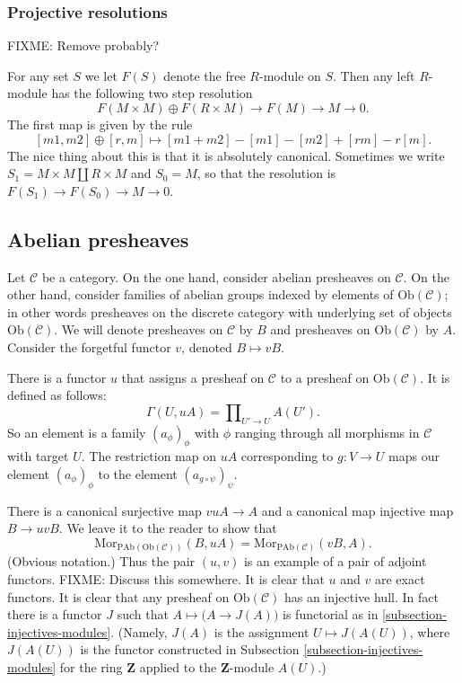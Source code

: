 \subsubsection{Projective resolutions}
\label{subsubsection-projective-resolution}

\noindent
FIXME: Remove probably?

\noindent
For any set $S$ we let $F(S)$ denote the free $R$-module on $S$.
Then any left $R$-module has the following two step resolution
$$
F(M\times M) \oplus F(R\times M) \to F(M) \to M \to 0.
$$
The first map is given by the rule
$$
[m1,m2] \oplus [r,m] \mapsto [m1+m2]-[m1]-[m2]+[rm]-r[m].
$$
The nice thing about this is that it is absolutely canonical.
Sometimes we write $S_1 = M\times M \coprod R\times M$ and
$S_0=M$, so that the resolution is $F(S_1) \to F(S_0) \to M \to 0$.

\subsection{Abelian presheaves}
\label{subsection-injectives-presheaves}

\noindent
Let $\mathcal{C}$ be a category. On the one hand, consider abelian
presheaves on $\mathcal{C}$. On the other hand, consider
families of abelian groups indexed by elements of
$\text{Ob}(\mathcal{C})$; in other words presheaves on the discrete
category with underlying set of objects $\text{Ob}(\mathcal{C})$.
We will denote presheaves on $\mathcal{C}$ by $B$ and presheaves on
$\text{Ob}(\mathcal{C})$ by $A$. Consider the forgetful functor $v$,
denoted $B \mapsto vB$.

\smallskip\noindent
There is a functor $u$ that assigns a presheaf on $\mathcal{C}$
to a presheaf on $\text{Ob}(\mathcal{C})$. It is defined as follows:
$$
\Gamma(U, uA) = \prod\nolimits_{U' \to U} A(U').
$$
So an element is a family $(a_\phi)_\phi$ with $\phi$
ranging through all morphisms in $\mathcal{C}$ with target $U$.
The restriction map on $uA$ corresponding to $g : V \to U$
maps our element $(a_\phi)_\phi$ to the element 
$(a_{g \circ \psi})_\psi$. 

\smallskip\noindent
There is a canonical surjective map $vuA \to A$ and a canonical map
injective map $B \to uvB$. We leave it to the reader to show that
$$
\text{Mor}_{\text{PAb}(\text{Ob}(\mathcal{C}))}(B, uA) =
\text{Mor}_{\text{PAb}(\mathcal{C})}(vB, A).
$$
(Obvious notation.) Thus the pair $(u,v)$ is an example of a pair of adjoint
functors. FIXME: Discuss this somewhere. It is clear that $u$ and $v$ are exact functors. It is clear that any presheaf on $\text{Ob}(\mathcal{C})$ has an
injective hull. In fact there is a functor $J$ such that
$A \mapsto \big(A \to J(A)\big)$ is functorial as in
\autoref{subsection-injectives-modules}.
(Namely, $J(A)$ is the assignment $U\mapsto J(A(U))$, where
$J(A(U))$ is the functor constructed in
Subsection \ref{subsection-injectives-modules} for the ring $\mathbf{Z}$
applied to the $\mathbf{Z}$-module $A(U)$.)

